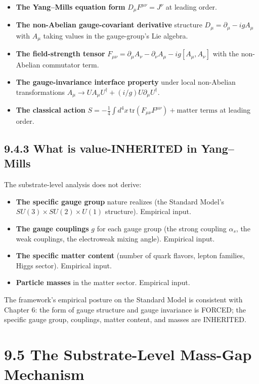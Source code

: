 \documentclass[11pt]{book}
\begin{document}
\begin{itemize}
\item \textbf{The Yang–Mills equation form} $D_\mu F^{\mu\nu} = J^\nu$ at leading order.
\item \textbf{The non-Abelian gauge-covariant derivative} structure $D_\mu = \partial_\mu - igA_\mu$ with $A_\mu$ taking values in the gauge-group's Lie algebra.
\item \textbf{The field-strength tensor} $F_{\mu\nu} = \partial_\mu A_\nu - \partial_\nu A_\mu - ig[A_\mu, A_\nu]$ with the non-Abelian commutator term.
\item \textbf{The gauge-invariance interface property} under local non-Abelian transformations $A_\mu \to U A_\mu U^\dagger + (i/g) U\partial_\mu U^\dagger$.
\item \textbf{The classical action} $S = -\frac{1}{4}\int d^4x\,\mathrm{tr}(F_{\mu\nu}F^{\mu\nu}) + \text{matter terms}$ at leading order.
\end{itemize}

\subsection{9.4.3 What is value-INHERITED in Yang–Mills}

The substrate-level analysis does not derive:

\begin{itemize}
\item \textbf{The specific gauge group} nature realizes (the Standard Model's $SU(3) \times SU(2) \times U(1)$ structure). Empirical input.
\item \textbf{The gauge couplings} $g$ for each gauge group (the strong coupling $\alpha_s$, the weak couplings, the electroweak mixing angle). Empirical input.
\item \textbf{The specific matter content} (number of quark flavors, lepton families, Higgs sector). Empirical input.
\item \textbf{Particle masses} in the matter sector. Empirical input.
\end{itemize}

The framework's empirical posture on the Standard Model is consistent with Chapter 6: the form of gauge structure and gauge invariance is FORCED; the specific gauge group, couplings, matter content, and masses are INHERITED.

\section{9.5 The Substrate-Level Mass-Gap Mechanism}
\end{document}
